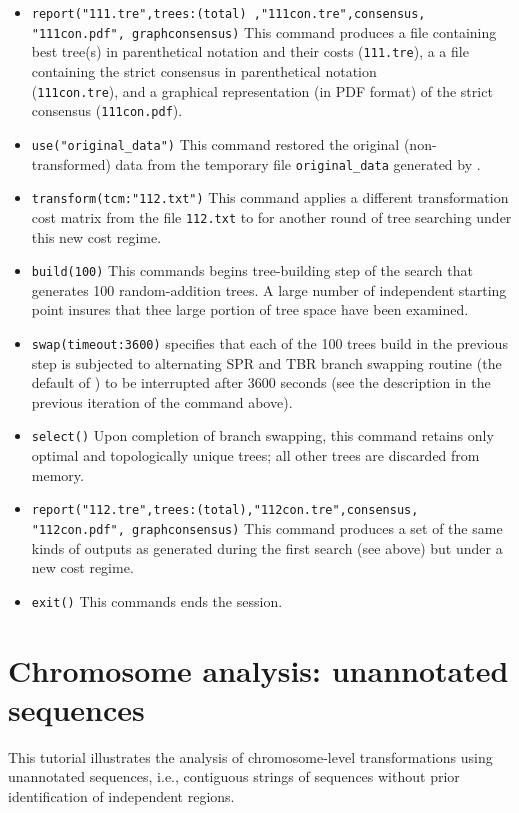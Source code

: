 \begin{itemize}
\item \texttt{report("111.tre",trees:(total) ,"111con.tre",consensus,\\"111con.pdf", graphconsensus)} This command produces a file containing best tree(s) in parenthetical notation and their costs (\texttt{111.tre}), a a file containing the strict consensus in parenthetical notation \\(\texttt{111con.tre}), and a graphical representation (in PDF format) of the strict consensus (\texttt{111con.pdf}).
\item \texttt{use("original\_data")} This command restored the original (non-trans\-formed) data from the temporary file \texttt{original\_data} generated by .
\item \texttt{transform(tcm:"112.txt")} This command applies a different transformation cost matrix from the file \texttt{112.txt} to for another round of tree searching under this new cost regime.
\item \texttt{build(100)} This commands begins tree-building step of the search that generates 100 random-addition trees. A large number of independent starting point insures that thee large portion of tree space have been examined.
\item \texttt{swap(timeout:3600)}  specifies that each of the 100 trees build in the previous step is subjected to alternating SPR and TBR branch swapping routine (the default of \poy) to be interrupted after 3600 seconds (see the description in the previous iteration of the command above).
\item \texttt{select()} Upon completion of branch swapping, this command retains only optimal and topologically unique trees; all other trees are discarded from memory.
\item \texttt{report("112.tre",trees:(total),"112con.tre",consensus,\\"112con.pdf", graphconsensus)} This command produces a set of the same kinds of outputs as generated during the first search (see above) but under a new cost regime.
\item \texttt{exit()} This commands ends the \poy session.
\end{itemize}

\section{Chromosome analysis: unannotated sequences}{\label{tutorial 6}}

This tutorial illustrates the analysis of chromosome-level transformations using 
unannotated sequences, i.e., contiguous strings of sequences without prior 
identification of independent regions. 

